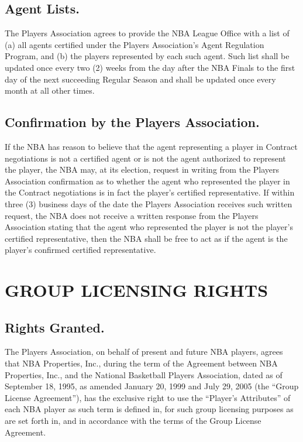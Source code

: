 \documentclass[
]{book}
\begin{document}
\hypertarget{agent-lists.}{%
\section{Agent Lists.}\label{agent-lists.}}

The Players Association agrees to provide the NBA League Office with a list of (a) all agents certified under the Players Association's Agent Regulation Program, and (b) the players represented by each such agent. Such list shall be updated once every two (2) weeks from the day after the NBA Finals to the first day of the next succeeding Regular Season and shall be updated once every month at all other times.

\hypertarget{confirmation-by-the-players-association.}{%
\section{Confirmation by the Players Association.}\label{confirmation-by-the-players-association.}}

If the NBA has reason to believe that the agent representing a player in Contract negotiations is not a certified agent or is not the agent authorized to represent the player, the NBA may, at its election, request in writing from the Players Association confirmation as to whether the agent who represented the player in the Contract negotiations is in fact the player's certified representative. If within three (3) business days of the date the Players Association receives such written request, the NBA does not receive a written response from the Players Association stating that the agent who represented the player is not the player's certified representative, then the NBA shall be free to act as if the agent is the player's confirmed certified representative.

\hypertarget{group-licensing-rights}{%
\chapter{GROUP LICENSING RIGHTS}\label{group-licensing-rights}}

\hypertarget{rights-granted.}{%
\section{Rights Granted.}\label{rights-granted.}}

The Players Association, on behalf of present and future NBA players, agrees that NBA Properties, Inc., during the term of the Agreement between NBA Properties, Inc., and the National Basketball Players Association, dated as of September 18, 1995, as amended January 20, 1999 and July 29, 2005 (the ``Group License Agreement''), has the exclusive right to use the ``Player's Attributes'' of each NBA player as such term is defined in, for such group licensing purposes as are set forth in, and in accordance with the terms of the Group License Agreement.
\end{document}
